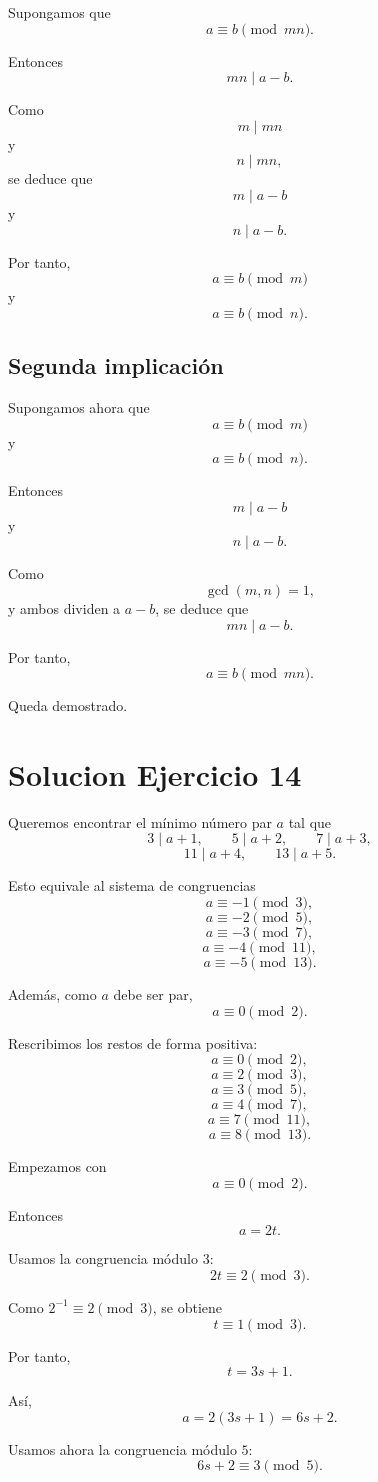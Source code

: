 \documentclass[12pt]{article}
\begin{document}
Supongamos que
\[
a\equiv b \pmod{mn}.
\]

Entonces
\[
mn\mid a-b.
\]

Como
\[
m\mid mn
\]
y
\[
n\mid mn,
\]
se deduce que
\[
m\mid a-b
\]
y
\[
n\mid a-b.
\]

Por tanto,
\[
a\equiv b \pmod m
\]
y
\[
a\equiv b \pmod n.
\]

\subsection*{Segunda implicación}

Supongamos ahora que
\[
a\equiv b \pmod m
\]
y
\[
a\equiv b \pmod n.
\]

Entonces
\[
m\mid a-b
\]
y
\[
n\mid a-b.
\]

Como
\[
\gcd(m,n)=1,
\]
y ambos dividen a \(a-b\), se deduce que
\[
mn\mid a-b.
\]

Por tanto,
\[
a\equiv b \pmod{mn}.
\]

Queda demostrado.

\section*{Solucion Ejercicio 14}

Queremos encontrar el mínimo número par \(a\) tal que
\[
3\mid a+1,\qquad 5\mid a+2,\qquad 7\mid a+3,
\]
\[
11\mid a+4,\qquad 13\mid a+5.
\]

Esto equivale al sistema de congruencias
\[
a\equiv -1 \pmod 3,
\]
\[
a\equiv -2 \pmod 5,
\]
\[
a\equiv -3 \pmod 7,
\]
\[
a\equiv -4 \pmod {11},
\]
\[
a\equiv -5 \pmod {13}.
\]

Además, como \(a\) debe ser par,
\[
a\equiv 0\pmod 2.
\]

Rescribimos los restos de forma positiva:
\[
a\equiv 0\pmod 2,
\]
\[
a\equiv 2\pmod 3,
\]
\[
a\equiv 3\pmod 5,
\]
\[
a\equiv 4\pmod 7,
\]
\[
a\equiv 7\pmod {11},
\]
\[
a\equiv 8\pmod {13}.
\]

Empezamos con
\[
a\equiv 0\pmod 2.
\]

Entonces
\[
a=2t.
\]

Usamos la congruencia módulo \(3\):
\[
2t\equiv 2\pmod 3.
\]

Como \(2^{-1}\equiv 2\pmod 3\), se obtiene
\[
t\equiv 1\pmod 3.
\]

Por tanto,
\[
t=3s+1.
\]

Así,
\[
a=2(3s+1)=6s+2.
\]

Usamos ahora la congruencia módulo \(5\):
\[
6s+2\equiv 3\pmod 5.
\]
\end{document}
